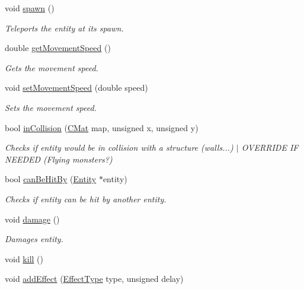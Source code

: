 \begin{DoxyCompactItemize}
void \hyperlink{structns_game_1_1_entity_ac09f45ca50c9fef57a50c4414fc7e20d}{spawn} ()
\begin{DoxyCompactList}\small\item\em Teleports the entity at its spawn. \end{DoxyCompactList}\item 
double \hyperlink{structns_game_1_1_entity_a03b934337b3c013abcccf3dfea6396d1}{get\+Movement\+Speed} ()
\begin{DoxyCompactList}\small\item\em Gets the movement speed. \end{DoxyCompactList}\item 
void \hyperlink{structns_game_1_1_entity_a0254c30b6223caa723303266ad04e4cd}{set\+Movement\+Speed} (double speed)
\begin{DoxyCompactList}\small\item\em Sets the movement speed. \end{DoxyCompactList}\item 
bool \hyperlink{structns_game_1_1_entity_a5dd00624fa76be09de80a6d2a982ea09}{in\+Collision} (\hyperlink{type_8h_a64a592133575ccebb1b36453acbec02b}{C\+Mat} map, unsigned x, unsigned y)
\begin{DoxyCompactList}\small\item\em Checks if entity would be in collision with a structure (walls...) $\vert$ O\+V\+E\+R\+R\+I\+DE IF N\+E\+E\+D\+ED (Flying monsters?) \end{DoxyCompactList}\item 
bool \hyperlink{structns_game_1_1_entity_ab5e14a11c0e89dce65f14366989a03b9}{can\+Be\+Hit\+By} (\hyperlink{structns_game_1_1_entity}{Entity} $\ast$entity)
\begin{DoxyCompactList}\small\item\em Checks if entity can be hit by another entity. \end{DoxyCompactList}\item 
void \hyperlink{structns_game_1_1_entity_a7a39068f9b48d1ec3fc5ef881e142b55}{damage} ()
\begin{DoxyCompactList}\small\item\em Damages entity. \end{DoxyCompactList}\item 
void \hyperlink{structns_game_1_1_entity_a522648b330daab91b49f78f0737a943f}{kill} ()
\item 
void \hyperlink{structns_game_1_1_entity_a0fbe0a80400a03319fbe3bd50919535c}{add\+Effect} (\hyperlink{namespacens_game_afea521dd2ba8e97be9549ce9936f4522}{Effect\+Type} type, unsigned delay)

\end{DoxyCompactItemize}
